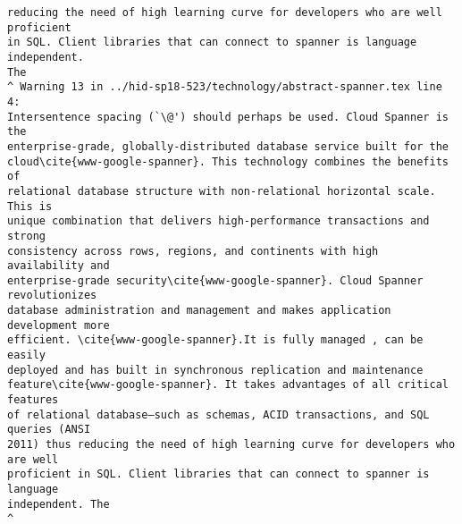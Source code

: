 \begin{IU}
\begin{tiny}
\begin{verbatim}
reducing the need of high learning curve for developers who are well proficient
in SQL. Client libraries that can connect to spanner is language independent.
The
^ Warning 13 in ../hid-sp18-523/technology/abstract-spanner.tex line 4:
Intersentence spacing (`\@') should perhaps be used. Cloud Spanner is the
enterprise-grade, globally-distributed database service built for the
cloud\cite{www-google-spanner}. This technology combines the benefits of
relational database structure with non-relational horizontal scale. This is
unique combination that delivers high-performance transactions and strong
consistency across rows, regions, and continents with high availability and
enterprise-grade security\cite{www-google-spanner}. Cloud Spanner revolutionizes
database administration and management and makes application development more
efficient. \cite{www-google-spanner}.It is fully managed , can be easily
deployed and has built in synchronous replication and maintenance
feature\cite{www-google-spanner}. It takes advantages of all critical features
of relational database—such as schemas, ACID transactions, and SQL queries (ANSI
2011) thus reducing the need of high learning curve for developers who are well
proficient in SQL. Client libraries that can connect to spanner is language
independent. The
^
\end{verbatim}
\end{tiny}
\end{IU}



